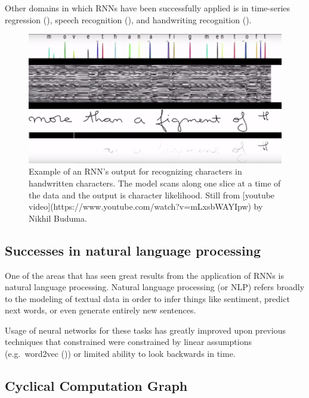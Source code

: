 \documentclass[]{book}
\theoremstyle{definition}
\theoremstyle{definition}
\theoremstyle{definition}
\theoremstyle{remark}
\begin{document}
Other domains in which RNNs have been successfully applied is in
time-series regression (\citet{rnn_regression}), speech recognition
(\citet{rnn_speach}), and handwriting recognition
(\citet{rnn_handwriting}).

\begin{figure}

{\centering \includegraphics[width=0.9\linewidth]{figures/handwriting_rnn} 

}

\caption{Example of an RNN's output for recognizing characters in handwritten characters. The model scans along one slice at a time of the data and the output is character likelihood. Still from [youtube video](https://www.youtube.com/watch?v=mLxsbWAYIpw) by Nikhil Buduma.}\label{fig:unnamed-chunk-3}
\end{figure}

\subsection{Successes in natural language
processing}\label{successes-in-natural-language-processing}

One of the areas that has seen great results from the application of
RNNs is natural language processing. Natural language processing (or
NLP) refers broadly to the modeling of textual data in order to infer
things like sentiment, predict next words, or even generate entirely new
sentences.

Usage of neural networks for these tasks has greatly improved upon
previous techniques that constrained were constrained by linear
assumptions (e.g.~word2vec (\citet{word2vec})) or limited ability to
look backwards in time.

\subsection{Cyclical Computation
Graph}\label{cyclical-computation-graph}
\end{document}
